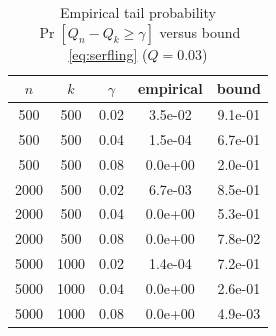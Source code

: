 \begin{table}[!t]
\caption{Empirical tail probability $\Pr[Q_n-Q_k\ge\gamma]$ versus bound \eqref{eq:serfling} ($Q=0.03$)}
\label{tab:tail}
\centering
\small
\begin{tabular}{@{}ccccc@{}}
\toprule
$n$ & $k$ & $\gamma$ & empirical & bound \\
\midrule
500 & 500 & 0.02 & 3.5e-02 & 9.1e-01 \\
500 & 500 & 0.04 & 1.5e-04 & 6.7e-01 \\
500 & 500 & 0.08 & 0.0e+00 & 2.0e-01 \\
2000 & 500 & 0.02 & 6.7e-03 & 8.5e-01 \\
2000 & 500 & 0.04 & 0.0e+00 & 5.3e-01 \\
2000 & 500 & 0.08 & 0.0e+00 & 7.8e-02 \\
5000 & 1000 & 0.02 & 1.4e-04 & 7.2e-01 \\
5000 & 1000 & 0.04 & 0.0e+00 & 2.6e-01 \\
5000 & 1000 & 0.08 & 0.0e+00 & 4.9e-03 \\
\bottomrule
\end{tabular}
\end{table}
